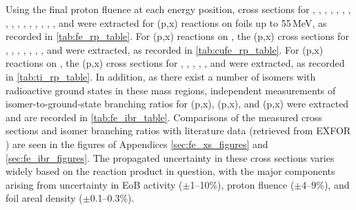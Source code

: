 Using the final proton fluence at each energy position, cross sections for , ,  , , ,  , , , , , , , , , , , and 
 were extracted for (p,x) reactions  on  foils up to 55\,MeV, as recorded in \autoref{tab:fe_rp_table}.
For  (p,x) reactions on , the (p,x) cross sections for  , , ,  , , , , and   were extracted, as recorded in \autoref{tab:cufe_rp_table}.
For  (p,x) reactions on , the (p,x) cross sections for  , , , , , and   were extracted, as recorded in \autoref{tab:ti_rp_table}.
In addition, as there exist a number of isomers with radioactive ground states in these mass regions,  independent measurements of isomer-to-ground-state branching ratios for (p,x), (p,x), and (p,x) were  extracted and are recorded in \autoref{tab:fe_ibr_table}.
Comparisons  of the measured cross sections and isomer branching ratios with literature data (retrieved from EXFOR \cite{Otuka2014272}) are seen in the figures of Appendices \ref{sec:fe_xs_figures} and \ref{sec:fe_ibr_figures}.
The propagated uncertainty in these cross sections varies widely based on the reaction product in question, with the major components  arising from uncertainty in EoB activity ($\pm$1--10\%), proton fluence ($\pm$4--9\%), and foil areal density ($\pm$0.1--0.3\%).





